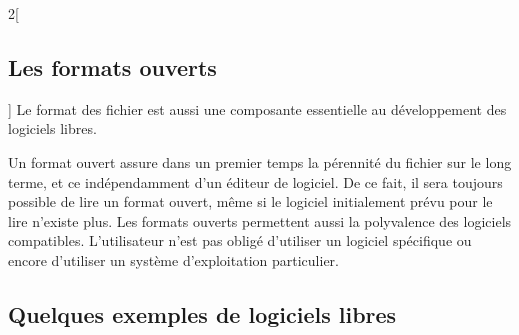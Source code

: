 \begin{multicols}{2}[\subsection{Les formats ouverts}]
Le format des fichier est aussi une composante essentielle au développement des logiciels libres.

Un \textcolor{Cdl}{format ouvert} assure dans un premier temps la pérennité du fichier sur le long terme, et ce indépendamment d’un éditeur de logiciel. De ce fait, il sera toujours possible de lire un format ouvert, même si le logiciel initialement prévu pour le lire n’existe plus. Les formats ouverts permettent aussi la polyvalence des logiciels compatibles. L’utilisateur n’est pas obligé d’utiliser un logiciel spécifique ou encore d’utiliser un système d’exploitation particulier.
\end{multicols}

\subsection{Quelques exemples de logiciels libres}

